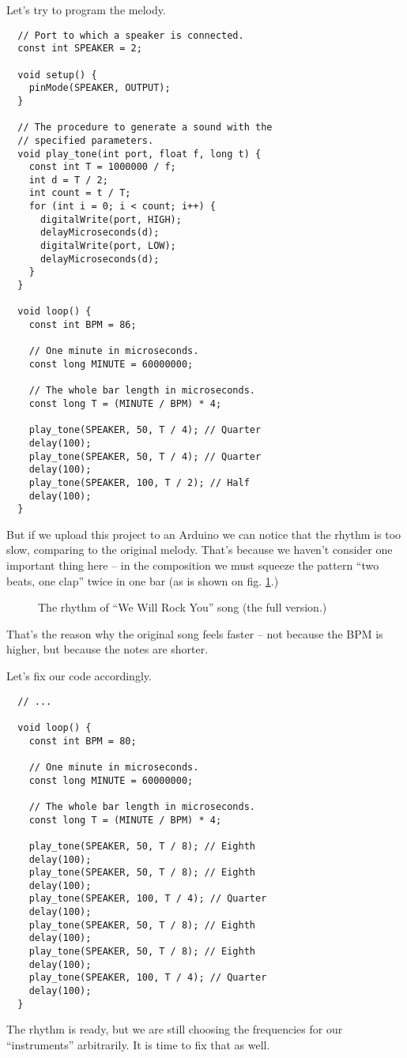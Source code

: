 \documentclass[../sparc.tex]{subfiles}
\begin{document}
Let's try to program the melody.

\begin{verbatim}
  // Port to which a speaker is connected.
  const int SPEAKER = 2;

  void setup() {
    pinMode(SPEAKER, OUTPUT);
  }

  // The procedure to generate a sound with the
  // specified parameters.
  void play_tone(int port, float f, long t) {
    const int T = 1000000 / f;
    int d = T / 2;
    int count = t / T;
    for (int i = 0; i < count; i++) {
      digitalWrite(port, HIGH);
      delayMicroseconds(d);
      digitalWrite(port, LOW);
      delayMicroseconds(d);
    }
  }

  void loop() {
    const int BPM = 86;

    // One minute in microseconds.
    const long MINUTE = 60000000;

    // The whole bar length in microseconds.
    const long T = (MINUTE / BPM) * 4;

    play_tone(SPEAKER, 50, T / 4); // Quarter
    delay(100);
    play_tone(SPEAKER, 50, T / 4); // Quarter
    delay(100);
    play_tone(SPEAKER, 100, T / 2); // Half
    delay(100);
  }
\end{verbatim}

But if we upload this project to an Arduino we can notice that the rhythm is too
slow, comparing to the original melody.  That's because we haven't consider one
important thing here -- in the composition we must squeeze the pattern ``two
beats, one clap'' twice in one bar (as is shown on
fig. \ref{fig:lilypond-queen-2}.)

\begin{figure}[ht]
  \centering
  \caption{The rhythm of ``We Will Rock You'' song (the full version.)}
  \label{fig:lilypond-queen-2}
\end{figure}

That's the reason why the original song feels faster -- not because the BPM is
higher, but because the notes are shorter.

Let's fix our code accordingly.

\begin{verbatim}
  // ...

  void loop() {
    const int BPM = 80;

    // One minute in microseconds.
    const long MINUTE = 60000000;

    // The whole bar length in microseconds.
    const long T = (MINUTE / BPM) * 4;

    play_tone(SPEAKER, 50, T / 8); // Eighth
    delay(100);
    play_tone(SPEAKER, 50, T / 8); // Eighth
    delay(100);
    play_tone(SPEAKER, 100, T / 4); // Quarter
    delay(100);
    play_tone(SPEAKER, 50, T / 8); // Eighth
    delay(100);
    play_tone(SPEAKER, 50, T / 8); // Eighth
    delay(100);
    play_tone(SPEAKER, 100, T / 4); // Quarter
    delay(100);
  }
\end{verbatim}

The rhythm is ready, but we are still choosing the frequencies for our
``instruments'' arbitrarily.  It is time to fix that as well.
\end{document}
